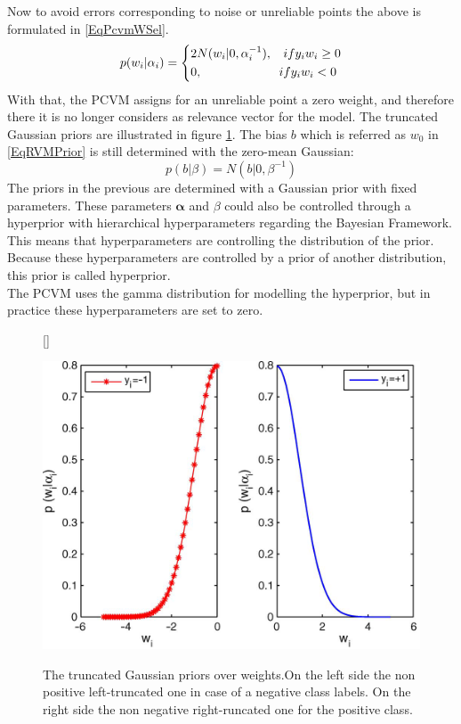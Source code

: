 Now to avoid errors corresponding to noise or unreliable points the above is formulated in \eqref{EqPcvmWSel}.\cite{Chen.2009}
\begin{equation}\label{EqPcvmWSel}
p(w_i \vert \alpha_i) =
\begin{dcases*}
2N(w_i \vert 0,\alpha_i^{-1} ),\>\>\>\>  if y_i w_i \ge 0\\
0				,\>\>\>\>\>\>\>\>\>\>\>\>\>\>\>\>\>\>\>\>\>\>\>\>\>\>\>\> if y_i w_i<0
\end{dcases*}
\end{equation}
With that, the \acs{PCVM} assigns for an unreliable point a zero weight, and therefore there it is no longer considers as relevance vector for the model.
The truncated Gaussian priors are illustrated in figure \ref{FigTruncGaus}.\newline
The bias $b$ which is referred as $w_0$ in \eqref{EqRVMPrior} is still determined with the zero-mean Gaussian:\cite{Chen.2009}
\begin{equation}\label{EqPcvmBPrior}
p(b \vert \beta) = N(b \vert 0, \beta^{-1})
\end{equation}
The priors in the previous are determined with a Gaussian prior with fixed parameters.
These parameters $\boldsymbol{\alpha }$ and $\beta$ could also be controlled through a hyperprior with hierarchical hyperparameters regarding the Bayesian Framework.
This means that hyperparameters are controlling the distribution of the prior. \cite[p. 71]{Bishop.2009}
Because these hyperparameters are controlled by a prior of another distribution, this prior is called hyperprior.\cite[.p 423]{Bishop.1995}\\
The \acs{PCVM} uses the gamma distribution for modelling the hyperprior, but in practice these hyperparameters are set to zero.\cite{Chen.2009}
\begin{figure}
	\centering
	[\FBwidth]
	{\caption[Truncated Gaussian Priors over Weights]{The truncated Gaussian priors over weights.On the left side the non positive left-truncated one in case of a negative class labels. On the right side the non negative right-runcated one for the positive class.\cite{Chen.2009}}}
	{\includegraphics[width=\linewidth]{figures/TuncatedGaussian.png}\label{FigTruncGaus}}
\end{figure}
